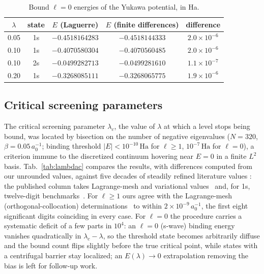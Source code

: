 \documentclass[12pt,twoside]{paper}
\newcommand{\Ha}{\,\mathrm{Ha}}
\begin{document}
\begin{table}[ht]
\caption{Bound $\ell=0$ energies of the Yukawa potential, in Ha.}
\label{tab:yukawa}
\centering
\small
\renewcommand{\arraystretch}{0.95}
\begin{tabular}{ccccc}
\hline
$\lambda$ & state & $E$ (Laguerre) & $E$ (finite differences) & difference \\
\hline
0.05 & 1s & $-0.4518164283$ & $-0.4518144333$ & $2.0\times10^{-6}$ \\
0.10 & 1s & $-0.4070580304$ & $-0.4070560485$ & $2.0\times10^{-6}$ \\
0.10 & 2s & $-0.0499282713$ & $-0.0499281610$ & $1.1\times10^{-7}$ \\
0.20 & 1s & $-0.3268085111$ & $-0.3268065775$ & $1.9\times10^{-6}$ \\
\end{tabular}
\end{table}

\subsection{Critical screening parameters}
\label{sec:critical}

The critical screening parameter $\lambda_c$, the value of $\lambda$ at
which a level stops being bound, was located by bisection on the number of
negative eigenvalues ($N=320$, $\beta=0.05\,a_0^{-1}$; binding threshold
$|E| < 10^{-10}\Ha$ for $\ell\ge1$, $10^{-7}\Ha$ for $\ell=0$), a
criterion immune to the discretized continuum hovering near $E=0$ in a
finite $L^2$ basis.
Tab.~\ref{tab:lambdac} compares the results, with differences computed
from our unrounded values, against five decades of steadily refined
literature values
\cite{Rogers1970,Diaz1991,delValle2018,JiaoCrit2021,Gebremedhin2023}: the
published column takes Lagrange-mesh and variational
values~\cite{delValle2018,Diaz1991} and, for 1s, twelve-digit
benchmarks~\cite{JiaoCrit2021,Gebremedhin2023}. For
$\ell \ge 1$ ours agree with the Lagrange-mesh (orthogonal-collocation)
determinations~\cite{delValle2018} to within $2\times10^{-9}\,a_0^{-1}$,
the first eight significant digits coinciding in every case. For
$\ell = 0$ the procedure carries a systematic deficit of a few parts in
$10^{4}$: an $\ell=0$ (s-wave) binding energy vanishes quadratically in
$\lambda_c - \lambda$, so the threshold state becomes arbitrarily diffuse
and the bound count flips slightly before the true critical point, while
states with a centrifugal barrier stay localized; an
$E(\lambda) \to 0$ extrapolation removing the bias is left for follow-up
work.
\end{document}
